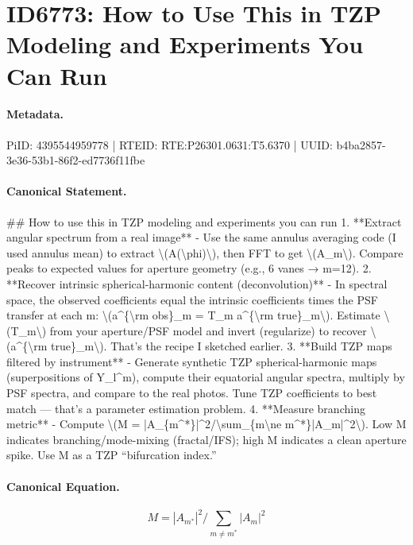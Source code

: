 \section*{ID6773: How to Use This in TZP Modeling and Experiments You Can Run}
\paragraph{Metadata.}
PiID: 4395544959778 | RTEID: RTE:P26301.0631:T5.6370 | UUID: b4ba2857-3e36-53b1-86f2-ed7736f11fbe

\paragraph{Canonical Statement.}
\#\# How to use this in TZP modeling and experiments you can run 1. **Extract angular spectrum from a real image** - Use the same annulus averaging code (I used annulus mean) to extract \textbackslash{}(A(\textbackslash{}phi)\textbackslash{}), then FFT to get \textbackslash{}(A\_m\textbackslash{}). Compare peaks to expected values for aperture geometry (e.g., 6 vanes → m=12). 2. **Recover intrinsic spherical-harmonic content (deconvolution)** - In spectral space, the observed coefficients equal the intrinsic coefficients times the PSF transfer at each m: \textbackslash{}(a\textasciicircum{}\{\textbackslash{}rm obs\}\_m = T\_m a\textasciicircum{}\{\textbackslash{}rm true\}\_m\textbackslash{}). Estimate \textbackslash{}(T\_m\textbackslash{}) from your aperture/PSF model and invert (regularize) to recover \textbackslash{}(a\textasciicircum{}\{\textbackslash{}rm true\}\_m\textbackslash{}). That’s the recipe I sketched earlier. 3. **Build TZP maps filtered by instrument** - Generate synthetic TZP spherical-harmonic maps (superpositions of Y\_l\textasciicircum{}m), compute their equatorial angular spectra, multiply by PSF spectra, and compare to the real photos. Tune TZP coefficients to best match — that’s a parameter estimation problem. 4. **Measure branching metric** - Compute \textbackslash{}(M = |A\_\{m\textasciicircum{}*\}|\textasciicircum{}2/\textbackslash{}sum\_\{m\textbackslash{}ne m\textasciicircum{}*\}|A\_m|\textasciicircum{}2\textbackslash{}). Low M indicates branching/mode-mixing (fractal/IFS); high M indicates a clean aperture spike. Use M as a TZP “bifurcation index.”

\paragraph{Canonical Equation.}
\[
M = |A_{m^*}|^2/\sum_{m\ne m^*}|A_m|^2
\]

